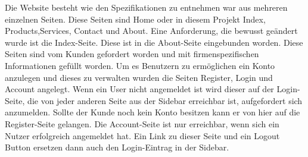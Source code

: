 Die Website besteht wie den Spezifikationen zu entnehmen war aus mehreren einzelnen Seiten. Diese Seiten sind Home oder in diesem Projekt Index, Products,Services, Contact und About. Eine Anforderung, die bewusst geändert wurde ist die Index-Seite. Diese ist in die About-Seite eingebunden worden. Diese Seiten sind vom Kunden gefordert worden und mit firmenspezifischen Informationen gefüllt worden. \newline
Um es Benutzern zu ermöglichen ein Konto anzulegen und dieses zu verwalten wurden die Seiten Register, Login und Account angelegt. Wenn ein User nicht angemeldet ist wird dieser auf der Login-Seite, die von jeder anderen Seite aus der Sidebar erreichbar ist, aufgefordert sich anzumelden. Sollte der Kunde noch kein Konto besitzen kann er von hier auf die Register-Seite gelangen. Die Account-Seite ist nur erreichbar, wenn sich ein Nutzer erfolgreich angemeldet hat. Ein Link zu dieser Seite und ein Logout Button ersetzen dann auch den Login-Eintrag in der Sidebar.
